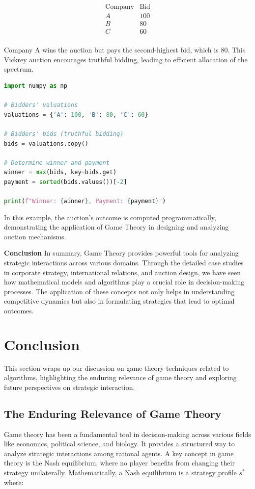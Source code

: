 \documentclass[12pt]{book} %
\begin{document}
\begin{equation}
\begin{array}{c|c}
\text{Company} & \text{Bid} \\
\hline
A & 100 \\
B & 80 \\
C & 60 \\
\end{array}
\end{equation}

Company A wins the auction but pays the second-highest bid, which is 80. This Vickrey auction encourages truthful bidding, leading to efficient allocation of the spectrum.

\FloatBarrier
\begin{lstlisting}[language=Python, caption=Example Python Code for Auction Bidding Simulation]
import numpy as np

# Bidders' valuations
valuations = {'A': 100, 'B': 80, 'C': 60}

# Bidders' bids (truthful bidding)
bids = valuations.copy()

# Determine winner and payment
winner = max(bids, key=bids.get)
payment = sorted(bids.values())[-2]

print(f"Winner: {winner}, Payment: {payment}")
\end{lstlisting}
\FloatBarrier

In this example, the auction's outcome is computed programmatically, demonstrating the application of Game Theory in designing and analyzing auction mechanisms.

\textbf{Conclusion}
In summary, Game Theory provides powerful tools for analyzing strategic interactions across various domains. Through the detailed case studies in corporate strategy, international relations, and auction design, we have seen how mathematical models and algorithms play a crucial role in decision-making processes. The application of these concepts not only helps in understanding competitive dynamics but also in formulating strategies that lead to optimal outcomes.


\section{Conclusion}
This section wraps up our discussion on game theory techniques related to algorithms, highlighting the enduring relevance of game theory and exploring future perspectives on strategic interaction.

\subsection{The Enduring Relevance of Game Theory}
Game theory has been a fundamental tool in decision-making across various fields like economics, political science, and biology. It provides a structured way to analyze strategic interactions among rational agents. A key concept in game theory is the Nash equilibrium, where no player benefits from changing their strategy unilaterally. Mathematically, a Nash equilibrium is a strategy profile $s^*$ where:
\end{document}
